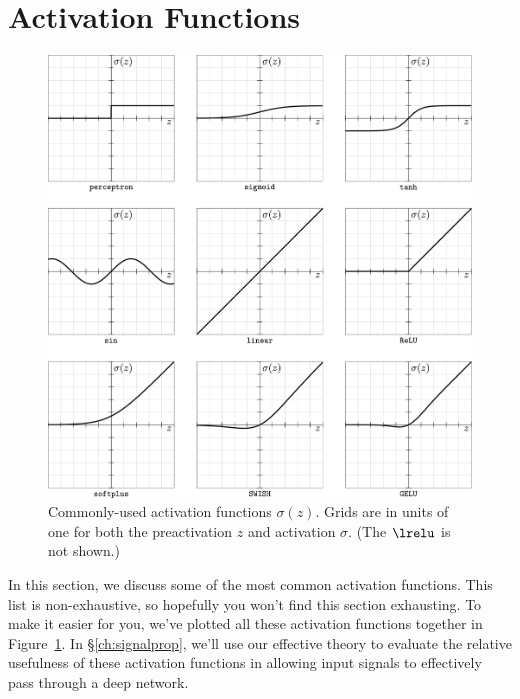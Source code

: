 











\section{Activation Functions}\label{sec:activations}
\begin{figure}\label{fig:activations}
\begin{center}
\includegraphics[width=.9\linewidth]{book_figures/activations/activations.pdf}
\caption{Commonly-used activation functions $\sigma(z)$. Grids are in units of one for both the preactivation $z$ and activation $\sigma$. 
(The $\lrelu$ is not shown.)}
\end{center}
\end{figure}
In this section, we discuss some of the most common activation functions. This list is non-exhaustive, so hopefully you won't find this section exhausting.
To make it easier for you, we've plotted all these activation functions together in Figure~\ref{fig:activations}. In \S\ref{ch:signalprop}, we'll use our effective theory to evaluate the relative usefulness of these activation functions in allowing input signals to effectively pass through a deep network.





